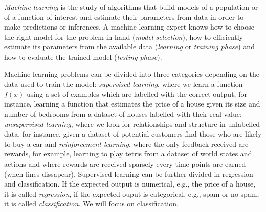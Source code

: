 \emph{Machine learning} is the study of algorithms that build models of a population or of a function of interest and estimate their parameters from data in order to make predictions or inferences. A machine learning expert knows how to choose the right model for the problem in hand (\emph{model selection}), how to efficiently estimate its parameters from the available data (\emph{learning} or \emph{training phase}) and how to evaluate the trained model (\emph{testing phase}).

Machine learning problems can be divided into three categories depending on the data used to train the model: \emph{supervised learning}, where we learn a function $f(x)$ using a set of examples which are labelled with the correct output, for instance, learning a function that estimates the price of a house given its size and number of bedrooms from a dataset of houses labelled with their real value; \emph{unsupervised learning}, where we look for relationships and structure in unlabelled data, for instance, given a dataset of potential customers find those who are likely to buy a car and \emph{reinforcement learning}, where the only feedback received are rewards, for example, learning to play tetris from a dataset of world states and actions and where rewards are received sparsely every time points are earned (when lines dissapear). Supervised learning can be further divided in regression and classification. If the expected output is numerical, e.g., the price of a house, it is called \emph{regression}, if the expected ouput is categorical, e.g., spam or no spam, it is called \emph{classification}. We will focus on classification.

